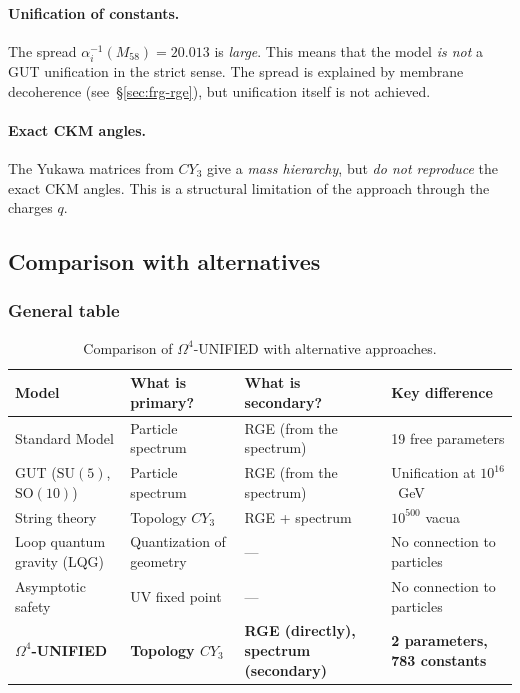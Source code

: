 \documentclass[11pt,a4paper]{article}
\newcommand{\SU}{\ensuremath{\mathrm{SU}}}
\newcommand{\SO}{\ensuremath{\mathrm{SO}}}
\newcommand{\CY}{\ensuremath{CY_3}}
\newcommand{\Om}{\ensuremath{\Omega^4}}
\theoremstyle{definition}
\begin{document}
\paragraph{Unification of constants.}
The spread $\alpha_i^{-1}(M_{58}) = 20.013$ is \emph{large}.
This means that the model \emph{is not} a GUT unification
in the strict sense. The spread is explained by membrane decoherence
(see~\S\ref{sec:frg-rge}), but unification itself is not achieved.

\paragraph{Exact CKM angles.}
The Yukawa matrices from $\CY$ give a \emph{mass hierarchy},
but \emph{do not reproduce} the exact CKM angles. This is a structural
limitation of the approach through the charges $q$.

\subsection{Comparison with alternatives}
\label{subsec:disc-comparison}

\subsubsection{General table}

\begin{table}[ht]
\centering
\caption{Comparison of \texorpdfstring{$\Om$}{}-UNIFIED with alternative approaches.}
\label{tab:comparison-alternatives}
\begin{tabular}{p{3.5cm}p{3cm}p{3cm}p{3cm}}
\toprule
Model & What is primary? & What is secondary? & Key difference \\
\midrule
Standard Model & Particle spectrum & RGE (from the spectrum) &
19 free parameters \\[0.3em]
GUT ($\SU(5)$, $\SO(10)$) & Particle spectrum & RGE (from the spectrum) &
Unification at $10^{16}$~GeV \\[0.3em]
String theory & Topology $\CY$ & RGE + spectrum &
$10^{500}$ vacua \\[0.3em]
Loop quantum gravity (LQG) & Quantization of geometry & --- &
No connection to particles \\[0.3em]
Asymptotic safety & UV fixed point & --- &
No connection to particles \\[0.3em]
\textbf{$\Om$-UNIFIED} & \textbf{Topology $\CY$} &
\textbf{RGE (directly), spectrum (secondary)} &
\textbf{2 parameters, 783 constants} \\
\bottomrule
\end{tabular}
\end{table}
\end{document}
